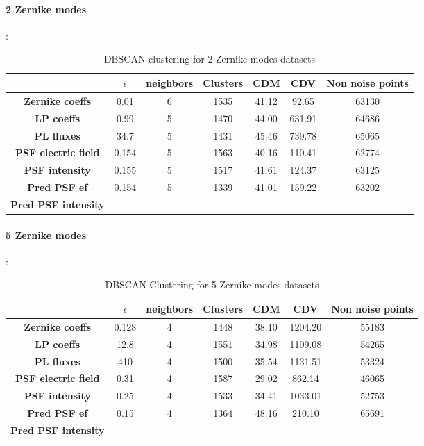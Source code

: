 		\paragraph{2 Zernike modes}:
		\begin{table}[h!]
			\centering
			\begin{tabular}{|c|c|c|c|c|c|c|}
				\hline
				\textbf{} & \textbf{$\epsilon$} & \textbf{neighbors} & \textbf{Clusters} & \textbf{CDM} & \textbf{CDV} & \textbf{Non noise points}\\
				\hline
				\textbf{Zernike coeffs} & 0.01 & 6 & 1535 & 41.12 & 92.65 & 63130 \\
				\hline
				\textbf{LP coeffs} & 0.99 & 5 & 1470 & 44.00 & 631.91 & 64686 \\
				\hline
				\textbf{PL fluxes} & 34.7 & 5 & 1431 & 45.46 & 739.78 & 65065 \\
				\hline
				\textbf{PSF electric field} & 0.154 & 5 & 1563 & 40.16 & 110.41 & 62774 \\
				\hline
				\textbf{PSF intensity} & 0.155 & 5 & 1517 & 41.61 & 124.37 & 63125 \\
				\hline
				\textbf{Pred PSF ef} & 0.154 & 5 & 1339 & 41.01 & 159.22 & 63202 \\
				\hline
				\textbf{Pred PSF intensity} &  &  &  &  &  &  \\
				\hline
			\end{tabular}
		\caption{DBSCAN clustering for 2 Zernike modes datasets}
		\end{table}
		\FloatBarrier
		
		\paragraph{5 Zernike modes}:
		\begin{table}[h!]
			\centering
			\begin{tabular}{|c|c|c|c|c|c|c|}
				\hline
				\textbf{} & \textbf{$\epsilon$} & \textbf{neighbors} & \textbf{Clusters} & \textbf{CDM} & \textbf{CDV} & \textbf{Non noise points}\\
				\hline
				\textbf{Zernike coeffs} & 0.128 & 4 & 1448 & 38.10 & 1204.20 & 55183 \\
				\hline
				\textbf{LP coeffs} & 12.8 & 4 & 1551 & 34.98 & 1109.08 & 54265 \\
				\hline
				\textbf{PL fluxes} & 410 & 4 & 1500 & 35.54 & 1131.51 & 53324 \\
				\hline
				\textbf{PSF electric field} & 0.31 & 4 & 1587 & 29.02 & 862.14 & 46065 \\
				\hline
				\textbf{PSF intensity} & 0.25 & 4 & 1533 & 34.41 & 1033.01 & 52753 \\
				\hline
				\textbf{Pred PSF ef} & 0.15 & 4 & 1364 & 48.16 & 210.10 & 65691 \\
				\hline
				\textbf{Pred PSF intensity} &  &  &  &  &  &  \\
				\hline
			\end{tabular}
		\caption{DBSCAN Clustering for 5 Zernike modes datasets}
		\end{table}
		\FloatBarrier
		
